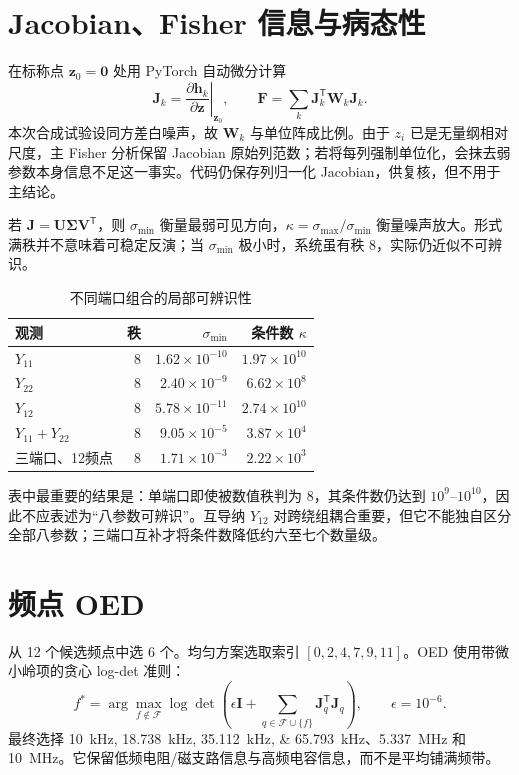 \documentclass[11pt,a4paper]{ctexart}
\begin{document}
\section{Jacobian、Fisher 信息与病态性}
在标称点 $\bm z_0=\bm 0$ 处用 PyTorch 自动微分计算
\begin{equation}
\bm J_k=\left.\frac{\partial\bm h_k}{\partial\bm z}\right|_{\bm z_0},\qquad
\bm F=\sum_k\bm J_k^\mathsf{T}\bm W_k\bm J_k.
\end{equation}
本次合成试验设同方差白噪声，故 $\bm W_k$ 与单位阵成比例。由于 $z_i$ 已是无量纲相对尺度，主 Fisher 分析保留 Jacobian 原始列范数；若将每列强制单位化，会抹去弱参数本身信息不足这一事实。代码仍保存列归一化 Jacobian，供复核，但不用于主结论。

若 $\bm J=\bm U\bm\Sigma\bm V^\mathsf{T}$，则 $\sigma_{\min}$ 衡量最弱可见方向，$\kappa=\sigma_{\max}/\sigma_{\min}$ 衡量噪声放大。形式满秩并不意味着可稳定反演；当 $\sigma_{\min}$ 极小时，系统虽有秩 8，实际仍近似不可辨识。

\begin{table}[htbp]
\centering
\caption{不同端口组合的局部可辨识性}
\begin{tabular}{lrrr}
\toprule
观测 & 秩 & $\sigma_{\min}$ & 条件数 $\kappa$\\
\midrule
$Y_{11}$ & 8 & $1.62\times10^{-10}$ & $1.97\times10^{10}$\\
$Y_{22}$ & 8 & $2.40\times10^{-9}$ & $6.62\times10^{8}$\\
$Y_{12}$ & 8 & $5.78\times10^{-11}$ & $2.74\times10^{10}$\\
$Y_{11}+Y_{22}$ & 8 & $9.05\times10^{-5}$ & $3.87\times10^{4}$\\
三端口、12频点 & 8 & $1.71\times10^{-3}$ & $2.22\times10^{3}$\\
\bottomrule
\end{tabular}
\end{table}

表中最重要的结果是：单端口即使被数值秩判为 8，其条件数仍达到 $10^9$--$10^{10}$，因此不应表述为``八参数可辨识''。互导纳 $Y_{12}$ 对跨绕组耦合重要，但它不能独自区分全部八参数；三端口互补才将条件数降低约六至七个数量级。

\section{频点 OED}
从 12 个候选频点中选 6 个。均匀方案选取索引 $[0,2,4,7,9,11]$。OED 使用带微小岭项的贪心 log-det 准则：
\begin{equation}
f^*=\arg\max_{f\notin\mathcal F}
\log\det\left(\epsilon\bm I+
\sum_{q\in\mathcal F\cup\{f\}}\bm J_q^\mathsf{T}\bm J_q\right),
\qquad \epsilon=10^{-6}.
\end{equation}
最终选择 \SIlist{10;18.738;35.112;65.793}{kHz}、\SI{5.337}{MHz} 和 \SI{10}{MHz}。它保留低频电阻/磁支路信息与高频电容信息，而不是平均铺满频带。
\end{document}
